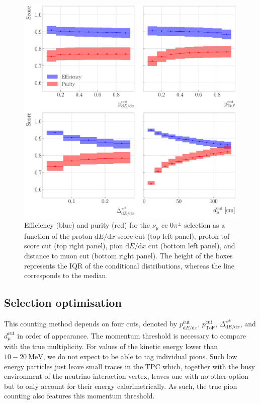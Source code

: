 \begin{figure}[t]
    \centering
    \includegraphics[width=.85\linewidth]{Images/GAr_selection/pion_selection_0_pions_metrics.pdf}
    \caption[Efficiency and purity for the $\nu_{\mu}$ \gls{cc} $0\pi^{\pm}$ selection as a function of the different cuts.]{Efficiency (blue) and purity (red) for the $\nu_{\mu}$ \gls{cc} $0\pi^{\pm}$ selection as a function of the proton $\mathrm{d}E/\mathrm{d}x$ score cut (top left panel), proton \gls{tof} score cut (top right panel), pion $\mathrm{d}E/\mathrm{d}x$ cut (bottom left panel), and distance to muon cut (bottom right panel). The height of the boxes represents the IQR of the conditional distributions, whereas the line corresponds to the median.}
    \label{fig:pion_selection_0_pions_metrics}
\end{figure}

\subsection{Selection optimisation}

This counting method depends on four cuts, denoted by $p^{\mathrm{cut}}_{\mathrm{d}E/\mathrm{d}x}$, $p^{\mathrm{cut}}_{\mathrm{ToF}}$, $\Delta^{\pi^{\pm}}_{\mathrm{d}E/\mathrm{d}x}$, and $d^{\mathrm{cut}}_{\mu}$ in order of appearance. The momentum threshold is necessary to compare with the true multiplicity. For values of the kinetic energy lower than $10-20~\mathrm{MeV}$, we do not expect to be able to tag individual pions. Such low energy particles just leave small traces in the TPC which, together with the busy environment of the neutrino interaction vertex, leaves one with no other option but to only account for their energy calorimetrically. As such, the true pion counting also features this momentum threshold.

